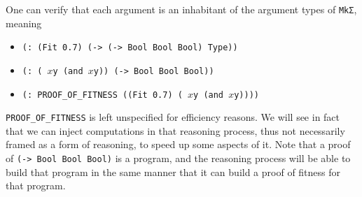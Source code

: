\documentclass[]{report}
\begin{document}
One can verify that each argument is an inhabitant of the argument
types of \texttt{MkΣ}, meaning
\begin{itemize}
\item \texttt{(: (Fit 0.7) (-> (-> Bool Bool Bool) Type))}
\item \texttt{(: (\ $x $y (and $x $y)) (-> Bool Bool Bool))}
\item \texttt{(: PROOF_OF_FITNESS ((Fit 0.7) (\ $x $y (and $x $y))))}
\end{itemize}
\texttt{PROOF_OF_FITNESS} is left unspecified for efficiency reasons.  We
will see in fact that we can inject computations in that reasoning
process, thus not necessarily framed as a form of reasoning, to speed
up some aspects of it.  Note that a proof of
\texttt{(-> Bool Bool Bool)}
is a program, and the reasoning process will be able to build that
program in the same manner that it can build a proof of fitness for
that program.
\end{document}
